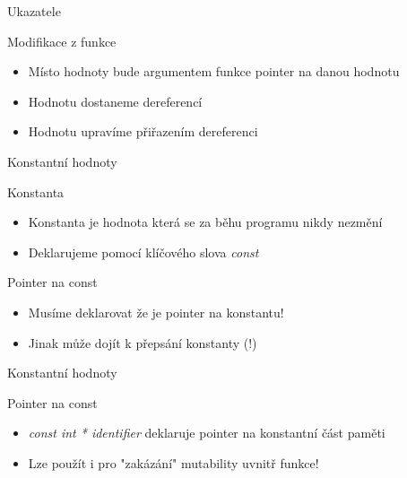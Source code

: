 \documentclass[9pt]{beamer}
\begin{document}
\begin{frame}{Ukazatele}
    \begin{block}{Modifikace z funkce}
        \begin{itemize}
            \item Místo hodnoty bude argumentem funkce pointer na danou hodnotu
            \item Hodnotu dostaneme dereferencí
            \item Hodnotu upravíme přiřazením dereferenci
        \end{itemize}
    \end{block}
    
\end{frame}

\begin{frame}{Konstantní hodnoty}
    \begin{block}{Konstanta}
        \begin{itemize}
            \item Konstanta je hodnota která se za běhu programu nikdy nezmění
            \item Deklarujeme pomocí klíčového slova \textit{const}
        \end{itemize}
    \end{block}
    
    \pause
    \begin{block}{Pointer na const}
        \begin{itemize}
            \item Musíme deklarovat že je pointer na konstantu!
            \item Jinak může dojít k přepsání konstanty (!)
        \end{itemize}
    \end{block}
    
\end{frame}

\begin{frame}{Konstantní hodnoty}
    \begin{block}{Pointer na const}
        \begin{itemize}
            \item \textit{const int * identifier} deklaruje pointer na konstantní část paměti
            \item Lze použít i pro "zakázání" mutability uvnitř funkce!
        \end{itemize}
    \end{block}
    
\end{frame}
\end{document}
